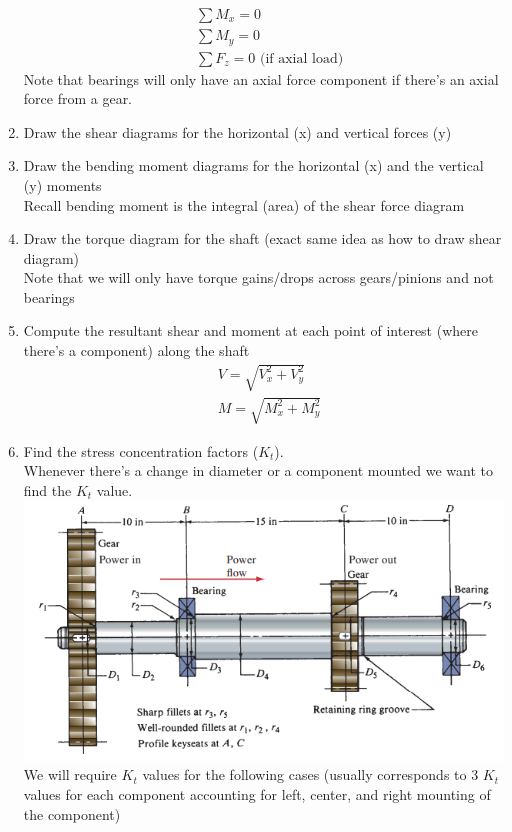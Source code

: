 \documentclass[11pt, fleqn]{article}
\begin{document}
\begin{enumerate}
\begin{align*}
        &\sum M_x=0\\
        &\sum M_y=0\\
        &\sum F_z=0 \text{ (if axial load)}
    \end{align*}
    Note that bearings will only have an axial force component if there's an axial force from a gear.
    \item Draw the shear diagrams for the horizontal (x) and vertical forces (y)
    \item Draw the bending moment diagrams for the horizontal (x) and the vertical (y) moments\\
    Recall bending moment is the integral (area) of the shear force diagram
    \item Draw the torque diagram for the shaft (exact same idea as how to draw shear diagram)\\
    Note that we will only have torque gains/drops across gears/pinions and not bearings
    \item Compute the resultant shear and moment at each point of interest (where there's a component) along the shaft
    \begin{align*}
        &V=\sqrt{V_x^2+V_y^2}\\
        &M=\sqrt{M_x^2+M_y^2}
    \end{align*}
    \item Find the stress concentration factors ($K_t$).\\
    Whenever there's a change in diameter or a component mounted we want to find the $K_t$ value.\\
    \includegraphics[scale=1]{Shafts/ShaftDiagram.png}\\
    We will require $K_t$ values for the following cases (usually corresponds to 3 $K_t$ values for each component accounting for left, center, and right mounting of the component)
    \begin{enumerate}

\end{enumerate}
\end{enumerate}
\end{document}
